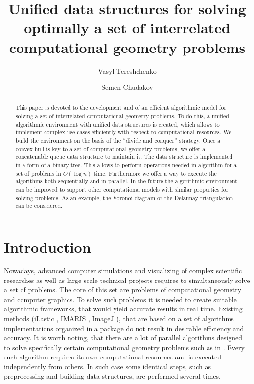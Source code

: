 \documentclass[a4paper,english,numberwithinsect,notab]{eurocg20-submission}
\title{Unified data structures for solving optimally a set of interrelated computational geometry problems}
\author[1]{Vasyl Tereshchenko}
\author[2]{Semen Chudakov}
\affil[1]{
	Faculty of computer science and cybernetics, Taras Shevchenko National University of Kyiv, Ukraine\\
  \texttt{vtereshch@gmail.com}}
\affil[2]{Faculty of computer science and cybernetics, Taras Shevchenko National University of Kyiv, Ukraine\\
  \texttt{semen.chudakov7@gmail.com}}
\begin{document}
\maketitle

\begin{abstract}
	This paper is devoted to the development and  of an efficient algorithmic model for solving a set of interrelated computational geometry problems. To do this, a unified algorithmic environment with unified data structures is created, which allows to implement complex use cases efficiently with respect to computational resources. We build the environment on the basis of the ``divide and conquer'' strategy. 
 	Once a convex hull is key to a set of computational geometry problems, we offer a concatenable queue data structure to maintain it. The data structure is implemented in a form of a binary tree. This allows to perform operations needed in algorithm for a set of problems in $O(\log n)$ time. Furthermore we offer a way to execute the algorithms both sequentially and in parallel.
	In the future the algorithmic environment can be improved to support other computational models with similar properties for solving problems. As an example, the Voronoi diagram or the Delaunay triangulation can be considered.
\end{abstract}

\section{Introduction}
\label{sec:introduction}

	Nowadays, advanced computer simulations and visualizing of complex scientific researches as well as large scale technical projects requires to simultaneously solve a set of problems. The core of this set are problems of computational geometry and computer graphics. To solve such problems it is needed to create suitable algorithmic frameworks, that would yield accurate results in real time. Existing methods (iLastic \cite{ilastik}, IMARIS \cite{imaris}, ImageJ \cite{imagej}), that are based on a set of algorithms implementations organized in a package do not result in desirable efficiency and accuracy. It is worth noting, that there are a lot of parallel algorithms designed to solve specifically certain computational geometry problems such as in \cite{aggarwal,atallah,cole,amato,chen,berkman,goodman,akl,jaja,leeuwen,reif}. Every such algorithm requires its own computational resources and is executed independently from others. In such case some identical steps, such as preprocessing and building data structures, are performed several times. 
	
\end{document}
